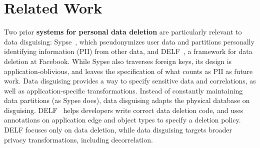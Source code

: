 \section{Related Work}
\label{sec:related}


%
Two prior \textbf{systems for personal data deletion} are particularly relevant to data
disguising: Sypse~\cite{sypse}, which pseudonymizes user
data and partitions personally identifying information (PII) from other data, and
DELF~\cite{delf}, a framework for data deletion at Facebook.
%
While Sypse also traverses foreign keys, its design is application-oblivious, and leaves
the specification of what counts as PII as future work.
%
Data disguising provides a way to specify sensitive data and correlations, as well as
application-specific transformations.
%
Instead of constantly maintaining data partitions (as Sypse does), data disguising adapts
the physical database on disguising.
%
%
%
DELF~\cite{delf} helps developers write correct data deletion code, and uses annotations on
application edge and object types to specify a deletion policy.
%
DELF focuses only on data deletion, while data disguising targets broader privacy
transformations, including decorrelation.
%

